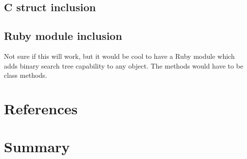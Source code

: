 \documentclass{article}
\begin{document}
\subsection{C struct inclusion}

\subsection{Ruby module inclusion}

Not sure if this will work, but it would be cool to have a Ruby module which
adds binary search tree capability to any object. The methods would have to be
class methods.

\section{References}

{}


\section{Summary}

\appendix
\end{document}
